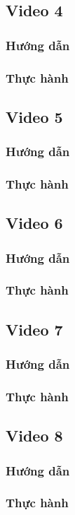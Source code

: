 \documentclass{article}
\begin{document}
\subsection{Video 4}
\subsubsection{Hướng dẫn}

\subsubsection{Thực hành}




\subsection{Video 5}
\subsubsection{Hướng dẫn}

\subsubsection{Thực hành}




\subsection{Video 6}
\subsubsection{Hướng dẫn}

\subsubsection{Thực hành}




\subsection{Video 7}
\subsubsection{Hướng dẫn}

\subsubsection{Thực hành}




\subsection{Video 8}
\subsubsection{Hướng dẫn}

\subsubsection{Thực hành}








\end{document}
